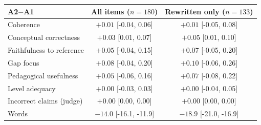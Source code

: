\begin{tabular}{lcc}
\toprule
A2$-$A1 & All items ($n{=}180$) & Rewritten only ($n{=}133$) \\
\midrule
Coherence & $+0.01$ [-0.04, 0.06] & $+0.01$ [-0.05, 0.08] \\
Conceptual correctness & $+0.03$ [0.01, 0.07] & $+0.05$ [0.01, 0.10] \\
Faithfulness to reference & $+0.05$ [-0.04, 0.15] & $+0.07$ [-0.05, 0.20] \\
Gap focus & $+0.08$ [-0.04, 0.20] & $+0.10$ [-0.06, 0.26] \\
Pedagogical usefulness & $+0.05$ [-0.06, 0.16] & $+0.07$ [-0.08, 0.22] \\
Level adequacy & $+0.00$ [-0.03, 0.03] & $+0.00$ [-0.04, 0.05] \\
Incorrect claims (judge) & $+0.00$ [0.00, 0.00] & $+0.00$ [0.00, 0.00] \\
Words & $-14.0$ [-16.1, -11.9] & $-18.9$ [-21.0, -16.9] \\
\bottomrule
\end{tabular}